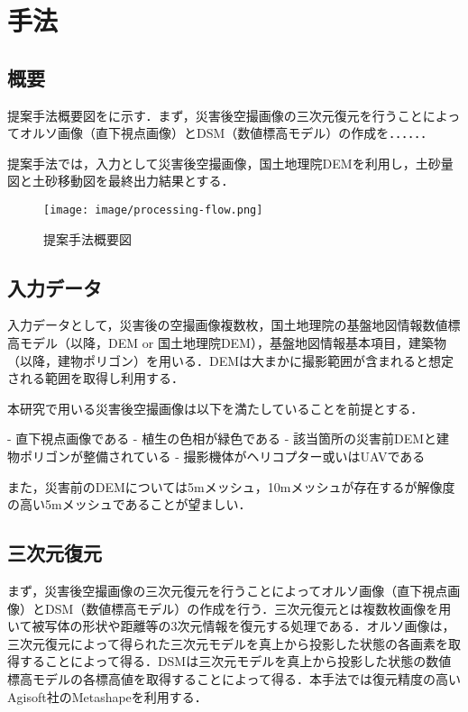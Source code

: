 \chapter{手法}
  \section{概要}
    提案手法概要図をに示す．まず，災害後空撮画像の三次元復元を行うことによってオルソ画像（直下視点画像）とDSM（数値標高モデル）の作成を．．．．．．

    提案手法では，入力として災害後空撮画像，国土地理院DEMを利用し，土砂量図と土砂移動図を最終出力結果とする．

    \begin{figure}[t]
      \centering
      \texttt{[image: image/processing-flow.png]}
      \caption{提案手法概要図}
      \label{提案手法概要図}
    \end{figure}


  \section{入力データ}
    \label{入力データ}
    入力データとして，災害後の空撮画像複数枚，国土地理院の基盤地図情報数値標高モデル（以降，DEM or 国土地理院DEM），基盤地図情報基本項目，建築物\cite{基盤地図情報}（以降，建物ポリゴン）を用いる．DEMは大まかに撮影範囲が含まれると想定される範囲を取得し利用する．

    本研究で用いる災害後空撮画像は以下を満たしていることを前提とする．

    - 直下視点画像である
    - 植生の色相が緑色である
    - 該当箇所の災害前DEMと建物ポリゴンが整備されている
    - 撮影機体がヘリコプター或いはUAVである

    また，災害前のDEMについては5mメッシュ，10mメッシュが存在するが解像度の高い5mメッシュであることが望ましい．


  \section{三次元復元}
    まず，災害後空撮画像の三次元復元を行うことによってオルソ画像（直下視点画像）とDSM（数値標高モデル）の作成を行う．三次元復元とは複数枚画像を用いて被写体の形状や距離等の3次元情報を復元する処理である．オルソ画像は，三次元復元によって得られた三次元モデルを真上から投影した状態の各画素を取得することによって得る．DSMは三次元モデルを真上から投影した状態の数値標高モデルの各標高値を取得することによって得る．本手法では復元精度の高いAgisoft社のMetashape\cite{Metashape}を利用する．

